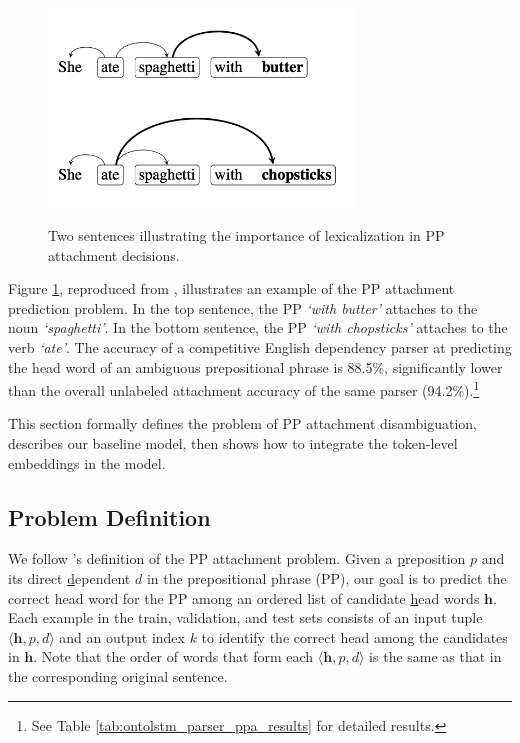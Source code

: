 \begin{figure}[t]
\begin{center}
\includegraphics[width=3.2in]{figures/pp_attachment_example.png}
\label{fig:ontolstm_pp_example}
\caption{ Two sentences illustrating the importance
of lexicalization in PP attachment decisions.}
\end{center}
\end{figure}

Figure \ref{fig:ontolstm_pp_example}, reproduced from \cite{belinkov2014exploring}, illustrates an example of the PP attachment prediction problem.
In the top sentence, the PP \textit{`with butter'} attaches to the noun \textit{`spaghetti'}. 
In the bottom sentence, the PP \textit{`with chopsticks'} attaches to the verb \textit{`ate'}.
The accuracy of a competitive English dependency parser at predicting the head word of an ambiguous prepositional phrase is 88.5\%, significantly lower than the overall unlabeled attachment accuracy of the same parser (94.2\%).\footnote{See Table \ref{tab:ontolstm_parser_ppa_results} for detailed results.}

This section formally defines the problem of PP attachment disambiguation, describes our baseline model, then shows how to integrate the token-level embeddings in the model.

\subsection{Problem Definition}
\label{sec:ontolstm_pp_problem_definition}
We follow \cite{belinkov2014exploring}'s definition of the PP attachment problem.
Given a \underline{p}reposition $p$ and its direct \underline{d}ependent $d$ in the prepositional phrase (PP), our goal is to predict the correct head word for the PP among an ordered list of candidate \underline{h}ead words $\boldsymbol{h}$.
Each example in the train, validation, and test sets consists of an input tuple $\langle \boldsymbol{h}, p, d \rangle$ and an output index $k$ to identify the correct head among the candidates in $\boldsymbol{h}$. Note that the order of words that form each $\langle \boldsymbol{h}, p, d\rangle$ is the same as that in the corresponding original sentence.

